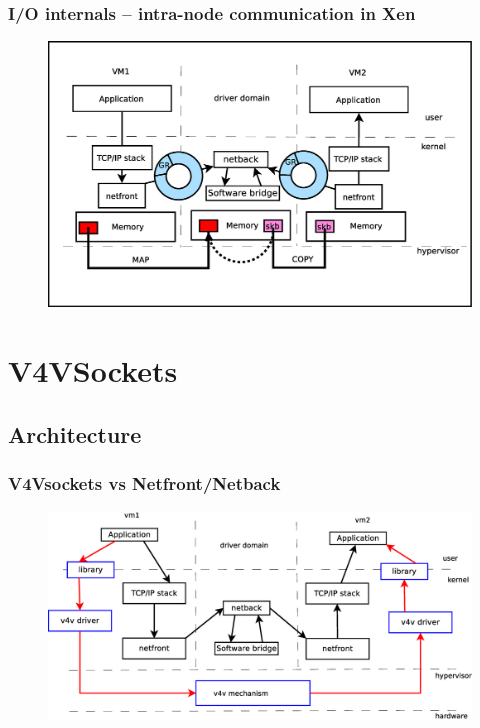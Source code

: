 \documentclass[red,slidestop,notes,compress,mathserif]{beamer}
\begin{document}
\begin{frame}
\frametitle{I/O internals -- intra-node communication in Xen}
\begin{figure}
\includegraphics[width=.9\textwidth]{figures/netfront_netback.eps}
\end{figure}
\end{frame}


\section{V4VSockets}

\subsection{Architecture}

\begin{frame}
\frametitle{V4Vsockets vs Netfront/Netback}
\begin{figure}
\includegraphics[width=\textwidth]{figures/paths.eps}
\end{figure}
\end{frame}
\end{document}
